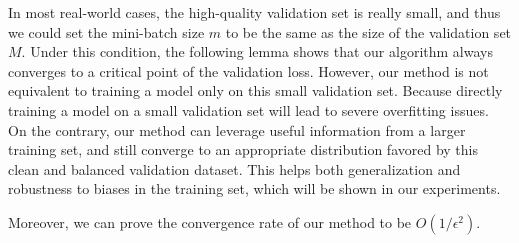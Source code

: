In most real-world cases, the high-quality validation set is really small, and thus we could set the
mini-batch size $m$ to be the same as the size of the validation set $M$. Under this condition, the
following lemma shows that our algorithm always converges to a critical point of the validation
loss. However, our method is not equivalent to training a model only on this small validation set.
Because directly training a model on a small validation set will lead to severe overfitting issues.
On the contrary, our method can leverage useful information from a larger training set, and still
converge to an appropriate distribution favored by this clean and balanced validation dataset. This
helps both generalization and robustness to biases in the training set, which will be shown in our
experiments.

\begin{lem}\label{lem:convergence}

\end{lem}
Moreover, we can prove the convergence rate of our method to be $O(1/\epsilon^2)$.

\begin{thm}\label{thm:convergencerate}

\end{thm}
